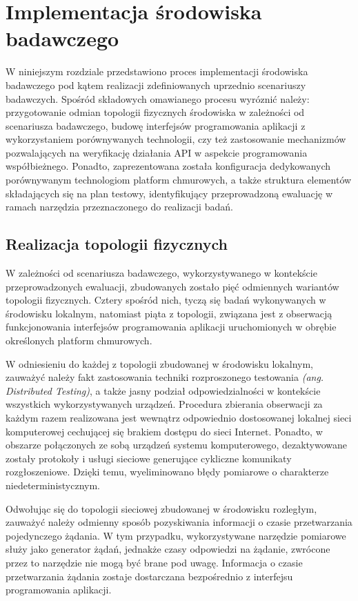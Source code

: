 \chapter{Implementacja środowiska badawczego}
W niniejszym rozdziale przedstawiono proces implementacji środowiska badawczego pod kątem realizacji zdefiniowanych uprzednio scenariuszy badawczych. Spośród składowych omawianego procesu wyróznić należy: przygotowanie odmian topologii fizycznych środowiska w zależności od scenariusza badawczego, budowę interfejsów programowania aplikacji z wykorzystaniem porównywanych technologii, czy też zastosowanie mechanizmów pozwalających na weryfikację działania API w aspekcie programowania współbieżnego. Ponadto, zaprezentowana została konfiguracja dedykowanych porównywanym technologiom platform chmurowych, a także struktura elementów składających się na plan testowy, identyfikujący przeprowadzoną ewaluację w ramach narzędzia przeznaczonego do realizacji badań.    
\section{Realizacja topologii fizycznych}
W zależności od scenariusza badawczego, wykorzystywanego w kontekście przeprowadzonych ewaluacji, zbudowanych zostało pięć odmiennych wariantów topologii fizycznych. Cztery spośród nich, tyczą się badań wykonywanych w środowisku lokalnym, natomiast piąta z topologii, związana jest z obserwacją funkcjonowania interfejsów programowania aplikacji uruchomionych w obrębie określonych platform chmurowych.

W odniesieniu do każdej z topologii zbudowanej w środowisku lokalnym, zauważyć należy fakt zastosowania techniki rozproszonego testowania \textit{(ang. Distributed Testing)}, a także jasny podział odpowiedzialności w kontekście wszystkich wykorzystywanych urządzeń. Procedura zbierania obserwacji za każdym razem realizowana jest wewnątrz odpowiednio dostosowanej lokalnej sieci komputerowej cechującej się brakiem dostępu do sieci Internet. Ponadto, w obszarze połączonych ze sobą urządzeń systemu komputerowego, dezaktywowane zostały protokoły i usługi sieciowe generujące cykliczne komunikaty rozgłoszeniowe. Dzięki temu, wyeliminowano błędy pomiarowe o charakterze niedeterministycznym.

Odwołując się do topologii sieciowej zbudowanej w środowisku rozległym, zauważyć należy odmienny sposób pozyskiwania informacji o czasie przetwarzania pojedynczego żądania. W tym przypadku, wykorzystywane narzędzie pomiarowe służy jako generator żądań, jednakże czasy odpowiedzi na żądanie, zwrócone przez to narzędzie nie mogą być brane pod uwagę. Informacja o czasie przetwarzania żądania zostaje dostarczana bezpośrednio z interfejsu programowania aplikacji.

